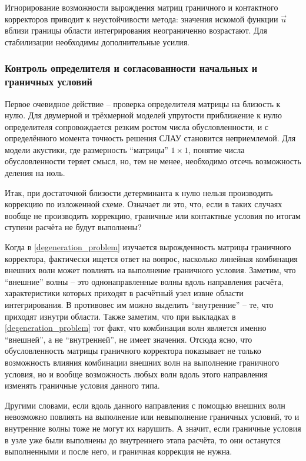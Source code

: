 Игнорирование возможности вырождения матриц граничного и контактного 
корректоров приводит к неустойчивости метода: значения искомой функции 
$\vec{u}$ вблизи границы области интегрирования неограниченно возрастают. 
Для стабилизации необходимы дополнительные усилия.


\subsubsection{Контроль определителя и согласованности начальных и граничных условий}
Первое очевидное действие -- проверка определителя матрицы на близость к нулю. 
Для двумерной и трёхмерной моделей упругости приближение к нулю определителя 
сопровождается резким ростом числа обусловленности, и с определённого момента 
точность решения СЛАУ становится неприемлемой. Для модели акустики, где размерность 
``матрицы'' $1 \times 1$, понятие числа обусловленности теряет смысл, но,
тем не менее, необходимо отсечь возможность деления на ноль. 

Итак, при достаточной близости детерминанта к нулю нельзя производить 
коррекцию по изложенной схеме. Означает ли это, что, 
если в таких случаях вообще не производить коррекцию, 
граничные или контактные условия по итогам ступени расчёта не будут выполнены? 

Когда в \ref{degeneration_problem} изучается вырожденность матрицы 
граничного корректора, фактически ищется ответ на вопрос, насколько линейная 
комбинация внешних волн может повлиять на выполнение граничного условия. 
Заметим, что ``внешние'' волны -- это однонаправленные волны вдоль направления расчёта, 
характеристики которых приходят в расчётный узел извне области интегрирования. 
В противовес им можно выделить ``внутренние'' -- те, что приходят изнутри области.
Также заметим, что при выкладках в \ref{degeneration_problem} тот факт, что комбинация 
волн является именно ``внешней'', а не ``внутренней'', не имеет значения. 
Отсюда ясно, что обусловленность матрицы граничного корректора показывает не только 
возможность влияния комбинации внешних волн на выполнение граничного условия, но и 
вообще возможность любых волн вдоль этого направления изменять граничные условия данного типа. 

Другими словами, если вдоль данного направления 
с помощью внешних волн невозможно повлиять на выполнение или невыполнение 
граничных условий, то и внутренние волны тоже не могут их нарушить.
А значит, если граничные условия в узле уже были выполнены до внутреннего этапа расчёта, то 
они останутся выполненными и после него, и граничная коррекция не нужна.


